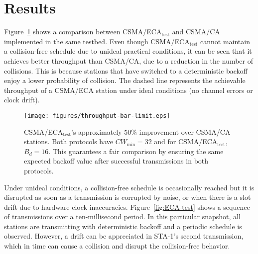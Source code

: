 \documentclass[conference]{IEEEtran}
\begin{document}
\section{Results}\label{results}
Figure~\ref{fig:throughput} shows a comparison between CSMA/ECA$_{\text{test}}$ and CSMA/CA implemented in the same testbed. Even though CSMA/ECA$_{\text{test}}$ cannot maintain a collision-free schedule due to unideal practical conditions, it can be seen that it achieves better throughput than CSMA/CA, due to a reduction in the number of collisions. This is because stations that have switched to a deterministic backoff enjoy a lower probability of collision. The dashed line represents the achievable throughput of a CSMA/ECA station under ideal conditions (no channel errors or clock drift). 

	
	\begin{figure}[htbp]
		\centering
		\texttt{[image: figures/throughput-bar-limit.eps]}
		\caption{CSMA/ECA$_{\text{test}}$'s approximately 50\% improvement over CSMA/CA stations. Both protocols have $CW_{\min}=32$ and for CSMA/ECA$_{\text{test}}$, $B_{d}=16$. This guarantees a fair comparison by ensuring the same expected backoff value after successful transmissions in both protocols.}
		\label{fig:throughput}
	\end{figure}

Under unideal conditions, a collision-free schedule is occasionally reached but it is disrupted as soon as a transmission is corrupted by noise, or when there is a slot drift due to hardware clock inaccuracies. Figure~\ref{fig:ECA-test} shows a sequence of transmissions over a ten-millisecond period. In this particular snapshot, all stations are transmitting with deterministic backoff and a periodic schedule is observed. However, a drift can be appreciated in STA-1's second transmission, which in time can cause a collision and disrupt the collision-free behavior.
\end{document}
